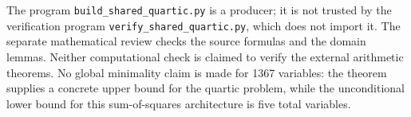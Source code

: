 The program \nolinkurl{build_shared_quartic.py} is a producer; it is not
trusted by the verification program
\nolinkurl{verify_shared_quartic.py}, which does not import it.
The separate mathematical review checks the source formulas and the
domain lemmas.  Neither computational check is claimed to verify the
external arithmetic theorems.  No global minimality claim is made for
1367 variables: the theorem supplies a concrete upper bound for the
quartic problem, while the unconditional lower bound for this
sum-of-squares architecture is five total variables.
